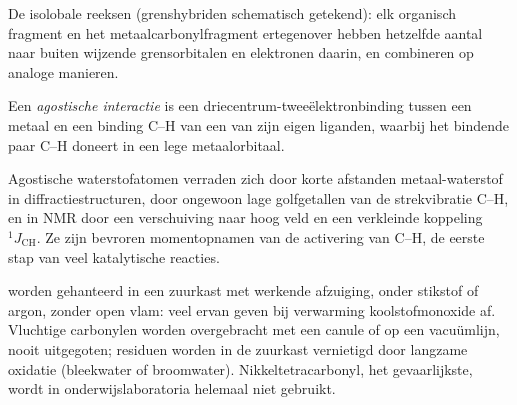 \begin{omfigure}

{\small De isolobale reeksen (grenshybriden schematisch getekend): elk
organisch fragment en het metaalcarbonylfragment ertegenover hebben
hetzelfde aantal naar buiten wijzende grensorbitalen en elektronen
daarin, en combineren op analoge manieren.}
\end{omfigure}

\begin{definition}\label{def:b3:organometallic-bonding:agostic}
Een \emph{agostische interactie} is een
driecentrum-tweeëlektronbinding tussen een metaal en een binding C--H van een van zijn eigen liganden, waarbij
het bindende paar C--H doneert in een lege metaalorbitaal.
\end{definition}

Agostische waterstofatomen verraden zich door korte afstanden
metaal-waterstof in diffractiestructuren, door ongewoon lage golfgetallen
van de strekvibratie C--H, en in NMR door een verschuiving naar hoog veld en een verkleinde koppeling $^1J_{\mathrm{CH}}$. Ze zijn bevroren momentopnamen van
de activering van C--H, de eerste stap van veel katalytische reacties.

\begin{inthelab}
 worden gehanteerd in een zuurkast met werkende afzuiging,
onder stikstof of argon, zonder open vlam: veel ervan geven bij
verwarming koolstofmonoxide af. Vluchtige carbonylen worden overgebracht
met een canule of op een vacuümlijn, nooit uitgegoten; residuen worden in
de zuurkast vernietigd door langzame oxidatie (bleekwater of broomwater).
Nikkeltetracarbonyl, het gevaarlijkste, wordt in onderwijslaboratoria
helemaal niet gebruikt.
\end{inthelab}

